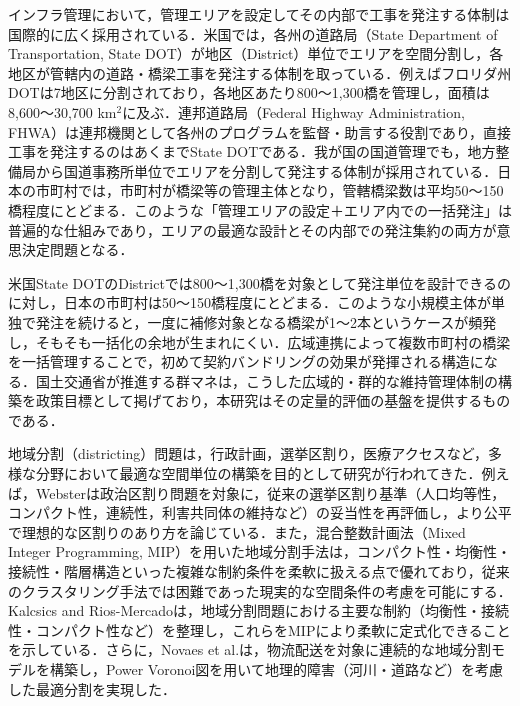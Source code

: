 \documentclass[Journal,letterpaper,InsideFigs,NoLineNumbers]{ascelike-new}
\begin{document}
インフラ管理において，管理エリアを設定してその内部で工事を発注する体制は国際的に広く採用されている．米国では，各州の道路局（State Department of Transportation, State DOT）が地区（District）単位でエリアを空間分割し，各地区が管轄内の道路・橋梁工事を発注する体制を取っている．例えばフロリダ州DOTは7地区に分割されており，各地区あたり800〜1,300橋を管理し，面積は8,600〜30,700 km\(^2\)に及ぶ\cite{fhwa2019}．連邦道路局（Federal Highway Administration, FHWA）は連邦機関として各州のプログラムを監督・助言する役割であり，直接工事を発注するのはあくまでState DOTである\cite{fhwafactsheet}．我が国の国道管理でも，地方整備局から国道事務所単位でエリアを分割して発注する体制が採用されている．日本の市町村では，市町村が橋梁等の管理主体となり，管轄橋梁数は平均50〜150橋程度にとどまる\cite{mlit2025gunmane}．このような「管理エリアの設定＋エリア内での一括発注」は普遍的な仕組みであり，エリアの最適な設計とその内部での発注集約の両方が意思決定問題となる．

米国State DOTのDistrictでは800〜1,300橋を対象として発注単位を設計できるのに対し，日本の市町村は50〜150橋程度にとどまる．このような小規模主体が単独で発注を続けると，一度に補修対象となる橋梁が1〜2本というケースが頻発し，そもそも一括化の余地が生まれにくい\cite{shikoku2019}．広域連携によって複数市町村の橋梁を一括管理することで，初めて契約バンドリングの効果が発揮される構造になる\cite{nara2023,mlit2024senkojirei}．国土交通省が推進する群マネ\cite{mlit2025gunmane}は，こうした広域的・群的な維持管理体制の構築を政策目標として掲げており，本研究はその定量的評価の基盤を提供するものである．

地域分割（districting）問題は，行政計画，選挙区割り，医療アクセスなど，多様な分野において最適な空間単位の構築を目的として研究が行われてきた．例えば，Webster\cite{webster2013}は政治区割り問題を対象に，従来の選挙区割り基準（人口均等性，コンパクト性，連続性，利害共同体の維持など）の妥当性を再評価し，より公平で理想的な区割りのあり方を論じている．また，混合整数計画法（Mixed Integer Programming, MIP）を用いた地域分割手法は，コンパクト性・均衡性・接続性・階層構造といった複雑な制約条件を柔軟に扱える点で優れており，従来のクラスタリング手法では困難であった現実的な空間条件の考慮を可能にする．Kalcsics and Rios-Mercado\cite{kalcsics2019}は，地域分割問題における主要な制約（均衡性・接続性・コンパクト性など）を整理し，これらをMIPにより柔軟に定式化できることを示している．さらに，Novaes et al.\cite{novaes2010}は，物流配送を対象に連続的な地域分割モデルを構築し，Power Voronoi図を用いて地理的障害（河川・道路など）を考慮した最適分割を実現した．
\end{document}
